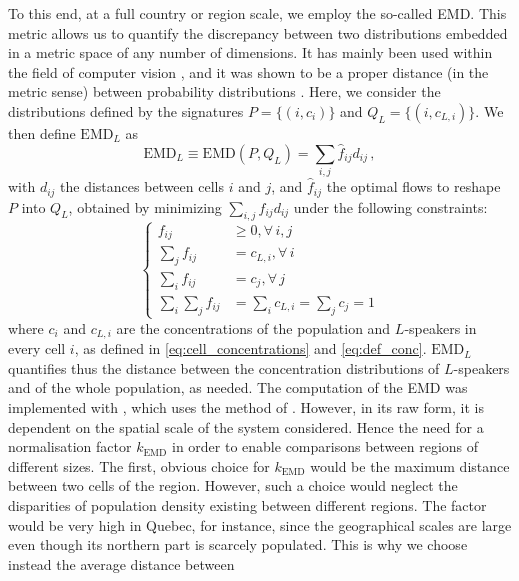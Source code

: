 \documentclass[../thesis.tex]{subfiles}
\begin{document}
To this end, at a full country or region scale, we employ the so-called \ac{EMD}. This
metric allows us to quantify the discrepancy between two distributions embedded in a
metric space of any number of dimensions. It has mainly been used within the field of
computer vision \cite{RubnerMetricDistributions1998}, and it was shown to be a proper
distance (in the metric sense) between probability distributions
\cite{LevinaEarthMover2001}. Here, we consider the distributions defined by the
signatures $P = \{ (i, c_i) \}$ and $Q_L = \{ (i, c_{L,i}) \}$. We then define
$\text{EMD}_L$ as 
\begin{equation}
\label{eq:emd_def}
  \text{EMD}_L \equiv \text{EMD}(P, Q_L) = \sum_{i,j} \hat{f}_{ij} d_{ij}\,,
\end{equation}
with $d_{ij}$ the distances between cells $i$ and $j$, and $\hat{f}_{ij}$ the optimal
flows to reshape $P$ into $Q_L$, obtained by minimizing $\sum_{i,j} f_{ij} d_{ij}$ under
the following constraints:
\begin{equation}
  \left\{
  \begin{aligned}
    f_{ij} & \geq 0, \forall \, i,j \\
    \sum_j f_{ij} & = c_{L,i}, \forall \, i \\
    \sum_i f_{ij} & = c_j, \forall \, j \\
    \sum_{i} \sum_j f_{ij} & = \sum_i c_{L,i} = \sum_j c_j = 1
  \end{aligned}
  \right.
\end{equation}
where $c_i$ and $c_{L,i}$ are the concentrations of the population and $L$-speakers in
every cell $i$, as defined in \cref{eq:cell_concentrations} and \cref{eq:def_conc}.
$\text{EMD}_L$ quantifies thus the distance between the concentration distributions of
$L$-speakers and of the whole population, as needed. The computation of the \ac{EMD} was
implemented with \cite{FlamaryPOTPython2021}, which uses the method of
\cite{BonneelDisplacementInterpolation2011}. However, in its raw form, it is dependent
on the spatial scale of the system considered. Hence the need for a normalisation factor
$k_\text{EMD}$ in order to enable comparisons between regions of different sizes. The
first, obvious choice for $k_\text{EMD}$ would be the maximum distance between two cells
of the region. However, such a choice would neglect the disparities of population
density existing between different regions. The factor would be very high in Quebec, for
instance, since the geographical scales are large even though its northern part is
scarcely populated. This is why we choose instead the average distance between
\end{document}
